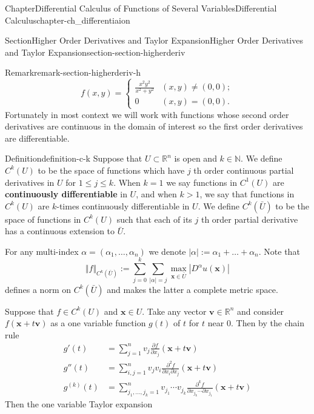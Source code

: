 \documentclass[oneside,10pt,]{book}
\newcommand{\terminology}[1]{\textbf{#1}}
\numberwithin{equation}{section}
\newcommand{\bv}{\mathbf{v}}
\newcommand{\bx}{\mathbf{x}}
\newcommand{\bbR}{\mathbb{R}}
\newcommand{\bbN}{\mathbb{N}}
\newcommand{\gt}{>}
\newcommand{\amp}{&}
\begin{document}
\begin{chapterptx}{Chapter}{Differential Calculus of Functions of Several Variables}{}{Differential Calculus}{}{}{chapter-ch_differentiaion}
\begin{sectionptx}{Section}{Higher Order Derivatives and Taylor Expansion}{}{Higher Order Derivatives and Taylor Expansion}{}{}{section-section-higherderiv}
\begin{remark}{Remark}{}{remark-section-higherderiv-h}
\begin{equation*}
f(x, y)=\begin{cases} \frac{x^{2}y^{2}}{x^{2}+y^{2}}\amp (x, y)\ne (0, 0);\\
0 \amp (x, y)=(0, 0). \end{cases}
\end{equation*}
Fortunately in most context we will work with functions whose second order derivatives are continuous in the domain of interest so the first order derivatives are differentiable.\end{remark}
\begin{definition}{Definition}{}{definition-c-k}%
%
\label{notation-c-k-b}%
Suppose that \(U\subset \bbR^{n}\) is open and \(k\in \bbN\). We define \(C^{k}(U)\) to be the space of functions which have \(j\) th order continuous partial derivatives in \(U\) for \(1\le j\le k\). When \(k=1\) we say functions in \(C^{1}(U)\) are \terminology{continuously differentiable} in \(U\), and when \(k\gt 1\), we say that functions in \(C^{k}(U)\) are \(k\)-times continuously differentiable in \(U\). We define \(C^{k}(\bar U)\) to be the space of functions in \(C^{k}(U)\) such that each of its \(j\) th order partial derivative has a continuous extension to \(\bar U\).\end{definition}
For any multi-index \(\alpha=(\alpha_{1},\ldots, \alpha_{n})\) we denote \(|\alpha| :=\alpha_{1}+\ldots+\alpha_{n}\). Note that%
\begin{equation*}
\Vert f\Vert_{C^{k}(\bar U)}:=\sum_{j=0}^{k}\sum_{|\alpha|=j}\max_{\bx \in \bar U}|D^{\alpha}u(\bx)|
\end{equation*}
defines  a norm on \(C^{k}(\bar U)\) and makes the latter a complete metric space.%
\par
Suppose that \(f\in C^{k}(U)\) and \(\bx \in U\). Take any vector \(\bv \in \bbR^{n}\) and consider \(f(\bx+ t\bv)\) as a one variable function \(g(t)\) of \(t\) for \(t\) near \(0\). Then by the chain rule%
\begin{align*}
g'(t)\amp =\sum_{j=1}^{n} v_{j}\frac{\partial f}{\partial x_{j}}(\bx+ t\bv)\\
g''(t)\amp =\sum_{i, j=1}^{n} v_{j}v_{i}\frac{\partial^{2} f}{\partial x_{i}\partial x_{j}}(\bx+ t\bv)\\
g^{(k)}(t)\amp =\sum_{j_{1},\ldots, j_{k}=1}^{n}v_{j_{1}}\cdots v_{j_{k}}
\frac{\partial^{k} f}{\partial x_{j_{k}}\cdots \partial x_{j_{1}}}(\bx+ t\bv)
\end{align*}
Then the one variable Taylor expansion%
\begin{equation}

\end{equation}
\end{sectionptx}
\end{chapterptx}
\end{document}

